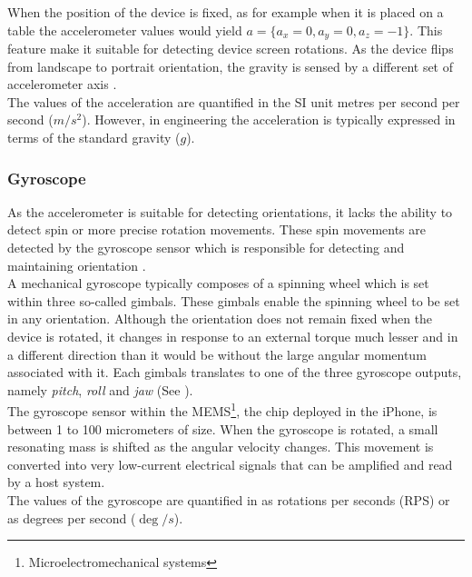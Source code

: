When the position of the device is fixed, as for example when it is placed on a table the accelerometer values would yield $a = \{ a_x = 0, a_y = 0, a_z = -1\}$. This feature make it suitable for detecting device screen rotations. As the device flips from landscape to portrait orientation, the gravity is sensed by a different set of accelerometer axis \cite{sensorsstudy}.\\

The values of the acceleration are quantified in the SI unit metres per second per second ($m/s^2$). However, in engineering the acceleration is typically expressed in terms of the standard gravity ($g$).

\subsubsection{Gyroscope}

As the accelerometer is suitable for detecting orientations, it lacks the ability to detect spin or more precise rotation movements. These spin movements are detected by the gyroscope sensor which is responsible for detecting and maintaining orientation \cite{sensorsstudy}. \\

A mechanical gyroscope typically composes of a spinning wheel which is set within three so-called gimbals. These gimbals enable the spinning wheel to be set in any orientation. Although the orientation does not remain fixed when the device is rotated, it changes in response to an external torque much lesser and in a different direction than it would be without the large angular momentum associated with it. Each gimbals translates to one of the three gyroscope outputs, namely \textit{pitch}, \textit{roll} and \textit{jaw} (See \cite{wiki:Gyroscope}). \\

The gyroscope sensor within the MEMS\footnote{Microelectromechanical systems}, the chip deployed in the iPhone, is between 1 to 100 micrometers of size. When the gyroscope is rotated, a small resonating mass is shifted as the angular velocity changes. This movement is converted into very low-current electrical signals that can be amplified and read by a host system. \\

The values of the gyroscope are quantified in as rotations per seconds (RPS) or as degrees per second ($\deg/s$).

